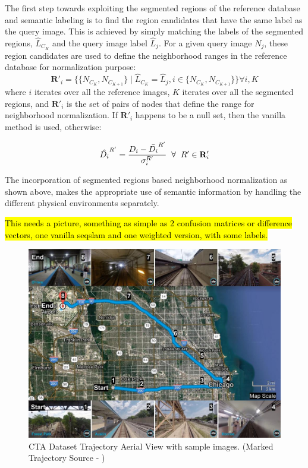 \documentclass[letterpaper, 10 pt, conference]{ieeeconf}  %
\begin{document}
The first step towards exploiting the segmented regions of the reference database and semantic labeling is to find the region candidates that have the same label as the query image. This is achieved by simply matching the labels of the segmented regions, $\hat{L}_{C_K}$ and the query image label $\hat{L}_j$. For a given query image $N_j$, these region candidates are used to define the neighborhood ranges in the reference database for normalization purpose:
\begin{equation}
 \mathbf{R}'_i = \{\{N_{C_K},N_{C_{K+1}}\}\mid\hat{L}_{C_K}=\hat{L}_j, i\in\{N_{C_K},N_{C_{K+1}}\} \} \forall i,K
\end{equation}
where $i$ iterates over all the reference images, $K$ iterates over all the segmented regions, and $\mathbf{R}'_i$ is the set of pairs of nodes that define the range for neighborhood normalization. If $\mathbf{R}'_i$ happens to be a null set, then the vanilla method is used, otherwise:

\begin{equation}
 \hat{D_i}^{R'} = \frac{D_i-\bar{D_i}^{R'}}{\sigma_i^{R'}} \hspace{0.2cm} \forall \hspace{0.2cm} R' \in \mathbf{R}'_i
 \label{eq:normScoreNew}
\end{equation}

The incorporation of segmented regions based neighborhood normalization as shown above, makes the appropriate use of semantic information by handling the different physical environments separately.

\hl{This needs a picture, something as simple as 2 confusion matrices or difference vectors, one vanilla seqslam and one weighted version, with some labels. }

\begin{figure}[h]
 \includegraphics[scale=0.25]{cta-datasetTrajSampleImages}
 \caption{CTA Dataset Trajectory Aerial View with sample images. (Marked Trajectory Source - \cite{ctaTrajGMap})}
 \label{fig:ctaTraj}
\end{figure}
\end{document}
